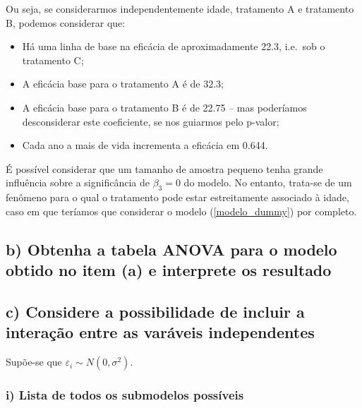 \documentclass[
  letterpaper,
  DIV=11,
  numbers=noendperiod]{scrartcl}
\providecommand{\tightlist}{%
  \setlength{\itemsep}{0pt}\setlength{\parskip}{0pt}}\usepackage{longtable,booktabs,array}
\begin{document}
Ou seja, se considerarmos independentemente idade, tratamento A e
tratamento B, podemos considerar que:

\begin{itemize}
\tightlist
\item
  Há uma linha de base na eficácia de aproximadamente 22.3, i.e.~sob o
  tratamento C;
\item
  A eficácia base para o tratamento A é de 32.3;
\item
  A eficácia base para o tratamento B é de 22.75 -- mas poderíamos
  desconsiderar este coeficiente, se nos guiarmos pelo p-valor;
\item
  Cada ano a mais de vida incrementa a eficácia em 0.644.
\end{itemize}

É possível considerar que um tamanho de amostra pequeno tenha grande
influência sobre a significância de \(\beta_3 = 0\) do modelo. No
entanto, trata-se de um fenômeno para o qual o tratamento pode estar
estreitamente associado à idade, caso em que teríamos que considerar o
modelo (\ref{modelo_dummy}) por completo.

\hypertarget{b-obtenha-a-tabela-anova-para-o-modelo-obtido-no-item-a-e-interprete-os-resultado}{%
\subsection{b) Obtenha a tabela ANOVA para o modelo obtido no item (a) e
interprete os
resultado}\label{b-obtenha-a-tabela-anova-para-o-modelo-obtido-no-item-a-e-interprete-os-resultado}}

\hypertarget{c-considere-a-possibilidade-de-incluir-a-interauxe7uxe3o-entre-as-varuxe1veis-independentes}{%
\subsection{c) Considere a possibilidade de incluir a interação entre as
varáveis
independentes}\label{c-considere-a-possibilidade-de-incluir-a-interauxe7uxe3o-entre-as-varuxe1veis-independentes}}

Supõe-se que \(\varepsilon_i \sim N(0, \sigma^2)\).

\hypertarget{i-lista-de-todos-os-submodelos-possuxedveis}{%
\subsubsection{i) Lista de todos os submodelos
possíveis}\label{i-lista-de-todos-os-submodelos-possuxedveis}}
\end{document}
